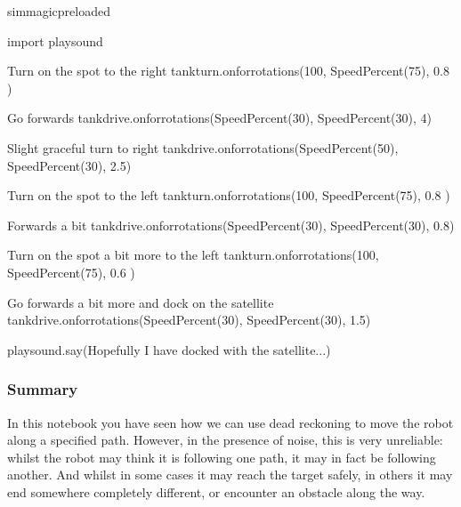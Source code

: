 \documentclass[letterpaper,10pt,english]{sphinxmanual}
\begin{document}
{
\begin{sphinxVerbatim}[commandchars=\\\{\}]
\llap{\color{nbsphinxin}[ ]:\,\hspace{\fboxrule}\hspace{\fboxsep}}\PYGZpc{}\PYGZpc{}sim\PYGZus{}magic\PYGZus{}preloaded

import playsound

\PYGZsh{} Turn on the spot to the right
tank\PYGZus{}turn.on\PYGZus{}for\PYGZus{}rotations(100, SpeedPercent(75), 0.8 )

\PYGZsh{} Go forwards
tank\PYGZus{}drive.on\PYGZus{}for\PYGZus{}rotations(SpeedPercent(30), SpeedPercent(30), 4)

\PYGZsh{} Slight graceful turn to right
tank\PYGZus{}drive.on\PYGZus{}for\PYGZus{}rotations(SpeedPercent(50), SpeedPercent(30), 2.5)

\PYGZsh{} Turn on the spot to the left
tank\PYGZus{}turn.on\PYGZus{}for\PYGZus{}rotations(\PYGZhy{}100, SpeedPercent(75), 0.8 )

\PYGZsh{} Forwards a bit
tank\PYGZus{}drive.on\PYGZus{}for\PYGZus{}rotations(SpeedPercent(30), SpeedPercent(30), 0.8)

\PYGZsh{}Turn on the spot a bit more to the left
tank\PYGZus{}turn.on\PYGZus{}for\PYGZus{}rotations(\PYGZhy{}100, SpeedPercent(75), 0.6 )

\PYGZsh{} Go forwards a bit more and dock on the satellite
tank\PYGZus{}drive.on\PYGZus{}for\PYGZus{}rotations(SpeedPercent(30), SpeedPercent(30), 1.5)

playsound.say(\PYGZdq{}Hopefully I have docked with the satellite...\PYGZdq{})
\end{sphinxVerbatim}
}


\subsubsection{Summary}
\label{\detokenize{content/03_Robot_Lab/Section_00_02:Summary}}
In this notebook you have seen how we can use dead reckoning to move the robot along a specified path. However, in the presence of noise, this is very unreliable: whilst the robot may think it is following one path, it may in fact be following another. And whilst in some cases it may reach the target safely, in others it may end somewhere completely different, or encounter an obstacle along the way.
\end{document}
